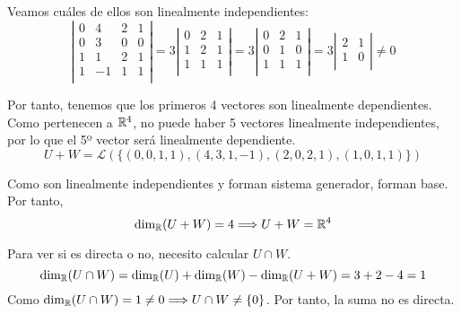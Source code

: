 \documentclass[12pt]{article}
\begin{document}
\begin{ejercicio}
\begin{enumerate}
        Veamos cuáles de ellos son linealmente independientes:
        \begin{equation*}
            \left|\begin{array}{cccc}
                0 & 4 & 2 & 1 \\
                0 & 3 & 0 & 0 \\
                1 & 1 & 2 & 1 \\
                1 & -1 & 1 & 1 \\
            \end{array}\right|
            = 3\left|\begin{array}{ccc}
                0 & 2 & 1 \\
                1 & 2 & 1 \\
                1 & 1 & 1 \\
            \end{array}\right|
            = 3\left|\begin{array}{ccc}
                0 & 2 & 1 \\
                0 & 1 & 0 \\
                1 & 1 & 1 \\
            \end{array}\right|
            = 3\left|\begin{array}{cc}
                2 & 1 \\
                1 & 0 \\
            \end{array}\right|\neq 0
        \end{equation*}

        Por tanto, tenemos que los primeros 4 vectores son linealmente dependientes. Como pertenecen a $\mathbb{R}^4$, no puede haber 5 vectores linealmente independientes, por lo que el 5º vector será linealmente dependiente.
        \begin{equation*}
            U+W = \mathcal{L}\left(\{(0,0,1,1),(4,3,1,-1), (2,0,2,1),(1,0,1,1)\}\right)
        \end{equation*}

        Como son linealmente independientes y forman sistema generador, forman base. Por tanto,
        \begin{equation*}
            \dim_{\mathbb{R}}(U+W)=4\Longrightarrow U+W=\mathbb{R}^4
        \end{equation*}

        Para ver si es directa o no, necesito calcular $U\cap W$.
        \begin{equation*}
            \dim_{\mathbb{R}}(U\cap W)=\dim_{\mathbb{R}}(U) + \dim_{\mathbb{R}}(W) - \dim_{\mathbb{R}}(U+W) = 3+2-4=1
        \end{equation*}
        Como $\dim_{\mathbb{R}}(U\cap W)=1\neq 0 \Longrightarrow U\cap W\neq \{0\}$. Por tanto, la suma no es directa.
        

\end{enumerate}
\end{ejercicio}
\end{document}

